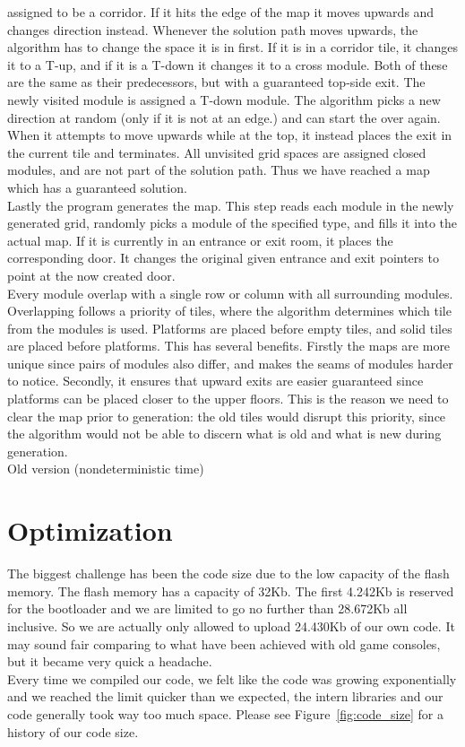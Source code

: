 assigned to be a corridor. If it hits the edge of the map it moves upwards and
changes direction instead. Whenever the solution path moves upwards, the
algorithm has to change the space it is in first. If it is in a corridor tile,
it changes it to a T-up, and if it is a T-down it changes it to a cross module.
Both of these are the same as their predecessors, but with a guaranteed
top-side exit. The newly visited module is assigned a T-down module. The
algorithm picks a new direction at random (only if it is not at an edge.) and
can start the over again. When it attempts to move upwards while at the top, it
instead places the exit in the current tile and terminates. All unvisited grid
spaces are assigned closed modules, and are not part of the solution path. Thus
we have reached a map which has a guaranteed solution.\\ Lastly the program
generates the map. This step reads each module in the newly generated grid,
randomly picks a module of the specified type, and fills it into the actual
map. If it is currently in an entrance or exit room, it places the
corresponding door. It changes the original given entrance and exit pointers to
point at the now created door.\\ Every module overlap with a single row or
column with all surrounding modules. Overlapping follows a priority of tiles,
where the algorithm determines which tile from the modules is used. Platforms
are placed before empty tiles, and solid tiles are placed before platforms.
This has several benefits. Firstly the maps are more unique since pairs of
modules also differ, and makes the seams of modules harder to notice. Secondly,
it ensures that upward exits are easier guaranteed since platforms can be
placed closer to the upper floors. This is the reason we need to clear the map
prior to generation: the old tiles would disrupt this priority, since the
algorithm would not be able to discern what is old and what is new during
generation.\\ Old version (nondeterministic time)

\section{Optimization}%
The biggest challenge has been the code size due
to the low capacity of the flash memory.  The flash memory has a capacity of
32Kb. The first 4.242Kb is reserved for the bootloader and we are limited to go
no further than 28.672Kb all inclusive. So we are actually
only allowed to upload 24.430Kb of our own code. It may sound fair
comparing to what have been achieved with old game consoles, but it became very
quick  a headache.
\\
Every time we compiled our code, we felt
like the code was growing exponentially and we reached the limit quicker than
we expected, the intern libraries and our code generally took way too much
space. Please see Figure~\ref{fig:code_size} for a history of our code size.

